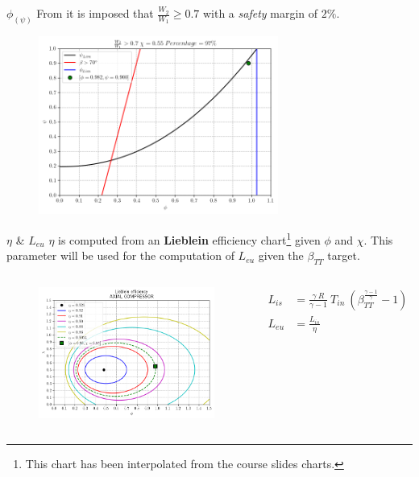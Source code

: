 	\begin{frame}{$\phi_{(\psi)}$}
		From \cite[Sec. 10.4]{axial2004} it is imposed that $\frac{W_2}{W_1} \geq 0.7$ with a \textit{safety} margin of $2 \%$.  
		\begin{figure}
			\centering
			\includegraphics[width=0.7\textwidth]{figures/stagePerf.png}
		\end{figure}
	\end{frame}
	\begin{frame}{$\eta$ \& $L_{eu}$}
		$\eta$ is computed from an \textbf{Lieblein} efficiency chart\footnote{This chart has been interpolated from the course slides charts.} given $\phi$ and $\chi$. This parameter will be used for the computation of $L_{eu}$ given the $\beta_{TT}$ target.
		\begin{columns}
				\begin{figure}
					\centering 
					\includegraphics[width=1\textwidth]{figures/efficiency.png}
				\end{figure}
			\begin{align}
				L_{is} & = \frac{\gamma \ R}{\gamma - 1} \ T_{in} \ (\beta_{TT}^{{\frac{\gamma - 1}{\gamma}}} - 1) \\
				L_{eu} & = \frac{L_{is}}{\eta}
			\end{align}
		\end{columns}
	\end{frame}
